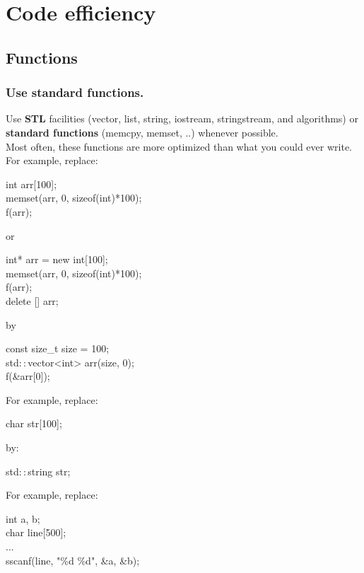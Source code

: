 \section{Code efficiency}

\subsection{Functions}
\subsubsection{Use standard functions.}
Use {\bf STL} facilities (vector, list, string, iostream,
stringstream, and algorithms) or {\bf standard functions} (memcpy,
memset, ..) whenever possible.\\
Most often, these functions are more optimized than what you could
ever write.\\

For example, replace:
\begin{algorithm}[H]
int arr[100]; \\
memset(arr, 0, sizeof(int)*100); \\
f(arr);
\end{algorithm}

or
\begin{algorithm}[H]
int* arr = new int[100]; \\
memset(arr, 0, sizeof(int)*100); \\
f(arr); \\
delete [] arr;
\end{algorithm}

by
\begin{algorithm}[H]
const size\_t size = 100; \\
std$::$vector<int> arr(size, 0); \\
f(\&arr[0]);
\end{algorithm}

For example, replace:
\begin{algorithm}[H]
  char str[100];
\end{algorithm}

by:
\begin{algorithm}[H]
std$::$string str;
\end{algorithm}

For example, replace:
\begin{algorithm}[H]
int a, b; \\
char line[500]; \\
... \\
sscanf(line, "\%d \%d", \&a, \&b); 
\end{algorithm}

